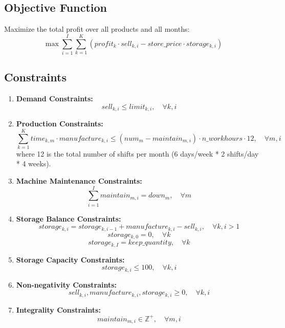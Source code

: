 \documentclass{article}
\begin{document}
\subsection*{Objective Function}
Maximize the total profit over all products and all months:
\[
\max \sum_{i=1}^{I} \sum_{k=1}^{K} \left( profit_k \cdot sell_{k,i} - store\_price \cdot storage_{k,i} \right)
\]

\subsection*{Constraints}
\begin{enumerate}
    \item \textbf{Demand Constraints:}
    \[
    sell_{k,i} \leq limit_{k,i}, \quad \forall k, i
    \]
    
    \item \textbf{Production Constraints:}
    \[
    \sum_{k=1}^{K} time_{k,m} \cdot manufacture_{k,i} \leq (num_{m} - maintain_{m,i}) \cdot n\_workhours \cdot 12, \quad \forall m, i
    \]
    where 12 is the total number of shifts per month (6 days/week * 2 shifts/day * 4 weeks).

    \item \textbf{Machine Maintenance Constraints:}
    \[
    \sum_{i=1}^{I} maintain_{m,i} = down_m, \quad \forall m
    \]
    
    \item \textbf{Storage Balance Constraints:}
    \[
    storage_{k,i} = storage_{k,i-1} + manufacture_{k,i} - sell_{k,i}, \quad \forall k, i>1
    \]
    \[
    storage_{k,0} = 0, \quad \forall k
    \]
    \[
    storage_{k,I} = keep\_quantity, \quad \forall k
    \]
    
    \item \textbf{Storage Capacity Constraints:}
    \[
    storage_{k,i} \leq 100, \quad \forall k, i
    \]
    
    \item \textbf{Non-negativity Constraints:}
    \[
    sell_{k,i}, manufacture_{k,i}, storage_{k,i} \geq 0, \quad \forall k, i
    \]
    
    \item \textbf{Integrality Constraints:}
    \[
    maintain_{m,i} \in \mathbb{Z}^{+}, \quad \forall m, i
    \]
\end{enumerate}
\end{document}
